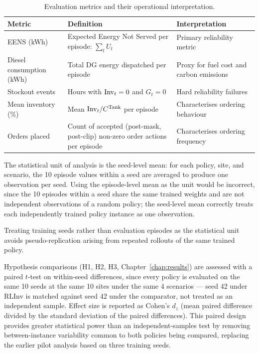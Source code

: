 \begin{table}[htb]
\centering
\small
\caption{Evaluation metrics and their operational interpretation.}
\label{tab:metrics}
\begin{tabular}{lp{4.0cm}p{5.0cm}}
\toprule
\textbf{Metric} & \textbf{Definition} & \textbf{Interpretation} \\
\midrule
EENS (kWh)      & Expected Energy Not Served per episode: $\sum_t U_t$
                & Primary reliability metric \\[4pt]
Diesel consumption (kWh) & Total DG energy dispatched per episode
                & Proxy for fuel cost and carbon emissions \\[4pt]
Stockout events & Hours with $\mathrm{Inv}_t = 0$ and $G_t = 0$
                & Hard reliability failures \\[4pt]
Mean inventory (\%) & Mean $\mathrm{Inv}_t / C^{\mathrm{Tank}}$ per episode
                & Characterises ordering behaviour \\[4pt]
Orders placed   & Count of accepted (post-mask, post-clip) non-zero
                  order actions per episode
                & Characterises ordering frequency \\
\bottomrule
\end{tabular}
\end{table}

The statistical unit of analysis is the seed-level mean: for each
policy, site, and scenario, the 10 episode values within a seed are
averaged to produce one observation per seed. Using the episode-level
mean as the unit would be incorrect, since the 10 episodes within a seed
share the same trained weights and are not independent observations of
a random policy; the seed-level mean correctly treats each independently
trained policy instance as one observation.

Treating training seeds rather than evaluation episodes as the
statistical unit avoids pseudo-replication arising from repeated
rollouts of the same trained policy.

Hypothesis comparisons (H1, H2, H3, Chapter~\ref{chap:results}) are
assessed with a paired $t$-test on within-seed differences, since every
policy is evaluated on the same 10 seeds at the same 10 sites under the
same 4 scenarios --- seed 42 under RLInv is matched against seed 42
under the comparator, not treated as an independent sample. Effect size
is reported as Cohen's $d_z$ (mean paired difference divided by the
standard deviation of the paired differences). This paired design
provides greater statistical power than an independent-samples test by
removing between-instance variability common to both policies being
compared, replacing the earlier pilot analysis based on three training
seeds.